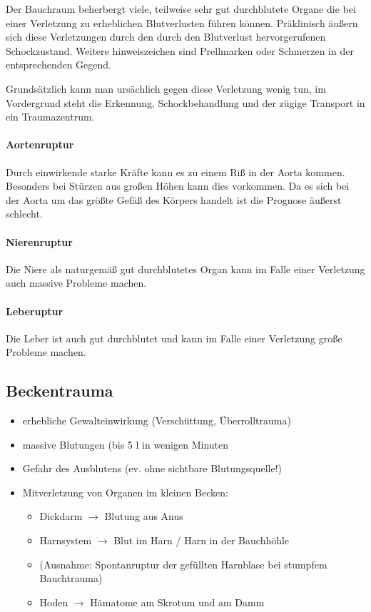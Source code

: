 Der Bauchraum beherbergt viele, teilweise sehr gut
durchblutete Organe die bei einer Verletzung zu erheblichen
Blutverlusten führen können. Präklinisch äußern sich diese
Verletzungen durch den durch den Blutverlust hervorgerufenen
Schockzustand. Weitere hinweiszeichen sind Prellmarken oder
Schmerzen in der entsprechenden Gegend.

Grundsätzlich kann man ursächlich gegen diese Verletzung
wenig tun, im Vordergrund steht die Erkennung,
Schockbehandlung und der zügige Transport in ein
Traumazentrum.

\paragraph{Aortenruptur}\label{topic:aortenruptur}Durch
einwirkende starke Kräfte kann es zu einem Riß in der Aorta
kommen. Besonders bei Stürzen aus großen Höhen kann dies
vorkommen. Da es sich bei der Aorta um das größte Gefäß des
Körpers handelt ist die Prognose äußerst schlecht.

\paragraph{Nierenruptur}\label{topic:nierenruptur}
Die Niere als naturgemäß gut durchblutetes Organ kann im
Falle einer Verletzung auch massive Probleme machen.

\paragraph{Leberuptur} Die Leber ist auch gut durchblutet
und kann im Falle einer Verletzung große Probleme machen.


\subsection{Beckentrauma}

\begin{itemize}
    \item erhebliche Gewalteinwirkung  (Versch\"uttung, \"Uberrolltrauma)
    \item massive  Blutungen (bis 5 l in wenigen  Minuten
    \item Gefahr des Ausblutens (ev. ohne sichtbare  Blutungsquelle!)
    \item Mitverletzung von Organen im kleinen  Becken:
    \begin{itemize}
        \item Dickdarm ${\rightarrow}$ Blutung aus Anus
        \item Harnsystem ${\rightarrow}$ Blut im Harn / Harn in der
        Bauchh\"ohle
        \item (Ausnahme: Spontanruptur der gef\"ullten  Harnblase bei stumpfem
        Bauchtrauma)
        \item Hoden ${\rightarrow}$ H\"amatome am Skrotum und am  Damm
    \end{itemize}
\end{itemize}


